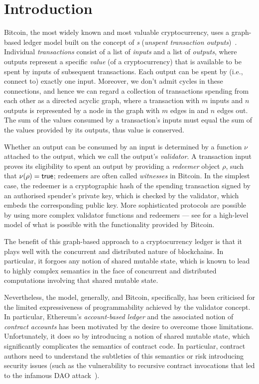 \section{Introduction}

Bitcoin, the most widely known and most valuable cryptocurrency, uses
a graph-based ledger model built on the concept of \emph{\UTXO{}s} (\emph{unspent
  transaction outputs})~\cite{formal-model-of-bitcoin-transactions,Zahnentferner18-UTxO}. Individual \emph{transactions} consist of a list of \emph{inputs} and a list of \emph{outputs}, where outputs represent a specific \emph{value} (of a cryptocurrency) that is available to be spent by inputs of subsequent transactions. Each output can be spent by (i.e., connect to) exactly one input. Moreover, we don't admit cycles in these connections, and hence we can regard a collection of transactions spending from each other as a directed acyclic graph, where a transaction with $m$ inputs and $n$ outputs is represented by a node in the graph with $m$ edges in and $n$ edges out.
The sum of the values consumed by a transaction's inputs must equal the sum of the values provided by its outputs, thus value is conserved.

Whether an output can be consumed by an input is determined by a function $\nu$ attached to the output, which we call the output's \emph{validator}. A transaction input proves its eligibility to spent an output by providing a \emph{redeemer} object $\rho$, such that \(\nu(\rho) = \textsf{true}\); redeemers are often called \emph{witnesses} in Bitcoin. In the simplest case, the redeemer is a cryptographic hash of the spending transaction signed by an authorised spender's private key, which is checked by the validator, which embeds the corresponding public key. More sophisticated protocols are possible by using more complex validator functions and redeemers --- see \cite{bitml} for a high-level model of what is possible with the functionality provided by Bitcoin.

The benefit of this graph-based approach to a cryptocurrency ledger is that it plays well with the concurrent and distributed nature of blockchains. In particular, it forgoes any notion of shared mutable state, which is known to lead to highly complex semantics in the face of concurrent and distributed computations involving that shared mutable state.

Nevertheless, the \UTXO{} model, generally, and Bitcoin, specifically, has been criticised for the limited expressiveness of programmability achieved by the validator concept. In particular, Ethereum's \emph{account-based ledger} and the associated notion of \emph{contract accounts} has been motivated by the desire to overcome those limitations. Unfortunately, it does so by introducing a notion of shared mutable state, which significantly complicates the semantics of contract code. In particular, contract authors need to understand the subtleties of this semantics or risk introducing security issues (such as the vulnerability to recursive contract invocations that led to the infamous DAO attack~\cite{DAO-attack}).

